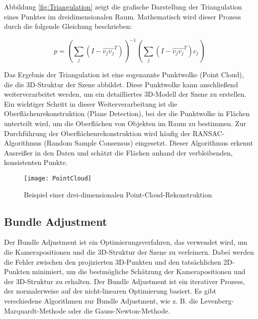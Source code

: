 Abbildung \ref{fig:Triangulation} zeigt die grafische Darstellung der Triangulation eines Punktes im dreidimensionalen Raum. Mathematisch wird dieser Prozess durch die folgende Gleichung beschrieben:

\[
p = \left( \sum_j \left( I - \hat{v_j} \hat{v_j}^T \right) \right)^{-1} \left( \sum_j \left( I - \hat{v_j} \hat{v_j}^T \right) c_j \right)
\]

Das Ergebnis der Triangulation ist eine sogenannte Punktwolke (Point Cloud), die die 3D-Struktur der Szene abbildet. Diese Punktwolke kann anschließend weiterverarbeitet werden, um ein detailliertes 3D-Modell der Szene zu erstellen. Ein wichtiger Schritt in dieser Weiterverarbeitung ist die Oberflächenrekonstruktion (Plane Detection), bei der die Punktwolke in Flächen unterteilt wird, um die Oberflächen von Objekten im Raum zu bestimmen. Zur Durchführung der Oberflächenrekonstruktion wird häufig der RANSAC-Algorithmus (Random Sample Consensus) eingesetzt. Dieser Algorithmus erkennt Ausreißer in den Daten und schätzt die Flächen anhand der verbleibenden, konsistenten Punkte.

\begin{figure}
    \centering
    \texttt{[image: PointCloud]}
    \caption{Beispiel einer drei-dimensionalen Point-Cloud-Rekonstruktion\label{fig:PointCloud}}\par
\end{figure}

\subsection{Bundle Adjustment}

Der Bundle Adjustment ist ein Optimierungsverfahren, das verwendet wird, um die Kamerapositionen und die 3D-Struktur der Szene zu verfeinern. Dabei werden die Fehler zwischen den projizierten 3D-Punkten und den tatsächlichen 2D-Punkten minimiert, um die bestmögliche Schätzung der Kamerapositionen und der 3D-Struktur zu erhalten. Der Bundle Adjustment ist ein iterativer Prozess, der normalerweise auf der nicht-linearen Optimierung basiert. Es gibt verschiedene Algorithmen zur Bundle Adjustment, wie z. B. die Levenberg-Marquardt-Methode oder die Gauss-Newton-Methode.